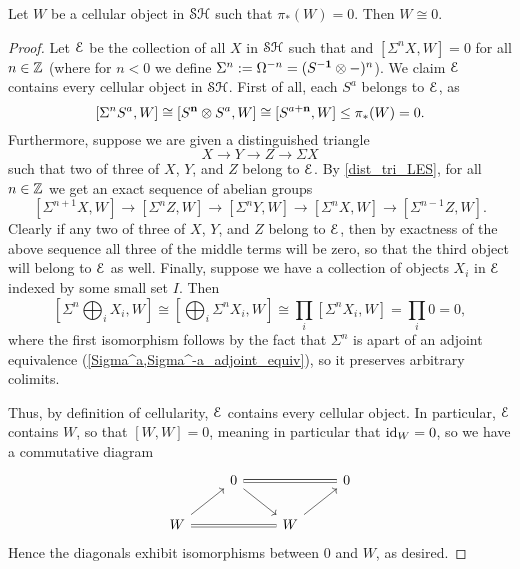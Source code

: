 \documentclass[../main.tex]{subfiles}
\begin{document}
\begin{lemma}\label{cellular_pi*=0_implies_contractible}
	Let $W$ be a cellular object in $\mathcal{SH}$ such that $\pi_*(W)=0$. Then $W\cong 0$.
\end{lemma}
\begin{proof}
	Let $\mathcal E$ be the collection of all $X$ in $\mathcal{SH}$ such that and $[\Sigma^nX,W]=0$ for all $n\in\mathbb{Z}$ (where for $n<0$ we define $\Sigma^n:=\Omega^{-n}=(S^{-\mathbf{1}}\otimes-)^n$). We claim $\mathcal E$ contains every cellular object in $\mathcal{SH}$. First of all, each $S^a$ belongs to $\mathcal E$, as 
	\[[\Sigma^nS^a,W]\cong[S^{\mathbf{n}}\otimes S^a,W]\cong[S^{a+\mathbf{n}},W]\leq\pi_*(W)=0.\] 
	Furthermore, suppose we are given a distinguished triangle
	\[X\to Y\to Z\to\Sigma X\]
	such that two of three of $X$, $Y$, and $Z$ belong to $\mathcal E$. By \autoref{dist_tri_LES}, for all $n\in\mathbb{Z}$ we get an exact sequence of abelian groups
	\[[\Sigma^{n+1}X,W]\to[\Sigma^nZ,W]\to[\Sigma^nY,W]\to[\Sigma^nX,W]\to[\Sigma^{n-1}Z,W].\]
	Clearly if any two of three of $X$, $Y$, and $Z$ belong to $\mathcal E$, then by exactness of the above sequence all three of the middle terms will be zero, so that the third object will belong to $\mathcal E$ as well. Finally, suppose we have a collection of objects $X_i$ in $\mathcal E$ indexed by some small set $I$. Then
	\[\left[\Sigma^n\bigoplus_iX_i,W\right]\cong\left[\bigoplus_i\Sigma^nX_i,W\right]\cong\prod_i[\Sigma^nX_i,W]=\prod_i0=0,\]
	where the first isomorphism follows by the fact that $\Sigma^n$ is apart of an adjoint equivalence (\autoref{Sigma^a,Sigma^-a_adjoint_equiv}), so it preserves arbitrary colimits.

	Thus, by definition of cellularity, $\mathcal E$ contains every cellular object. In particular, $\mathcal E$ contains $W$, so that $[W,W]=0$, meaning in particular that $\mathrm{id}_W=0$, so we have a commutative diagram
	\[\begin{tikzcd}
		& 0 && 0 \\
		W && W
		\arrow[from=2-1, to=1-2]
		\arrow[from=1-2, to=2-3]
		\arrow[from=2-3, to=1-4]
		\arrow[Rightarrow, no head, from=1-2, to=1-4]
		\arrow[Rightarrow, no head, from=2-1, to=2-3]
	\end{tikzcd}\]
	Hence the diagonals exhibit isomorphisms between $0$ and $W$, as desired.
\end{proof}
\end{document}
